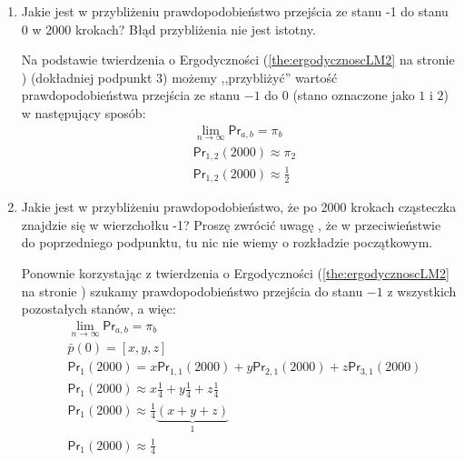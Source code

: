 \begin{enumerate}[label=\alph*)]
\item Jakie jest w przybliżeniu prawdopodobieństwo przejścia ze stanu -1 do stanu 0 w 2000 krokach? Błąd przybliżenia nie jest istotny.

Na podstawie twierdzenia o Ergodyczności (\ref{the:ergodycznoscLM2} na stronie \pageref{the:ergodycznoscLM2}) (dokładniej podpunkt 3) możemy ,,przybliżyć'' wartość prawdopodobieństwa przejścia ze stanu $-1$ do $0$ (stano oznaczone jako $1$ i $2$) w następujący sposób:
\begin{align*}
&\lim _{n\rightarrow \infty} \mathsf{Pr}_{a,b}=\pi _b\\
&\mathsf{Pr}_{1,2}(2000)\approx \pi _2\\
&\mathsf{Pr}_{1,2}(2000)\approx \frac{1}{2}
\end{align*}
\item Jakie jest w przybliżeniu prawdopodobieństwo, że po 2000 krokach cząsteczka znajdzie się w wierzchołku -1? Proszę zwrócić uwagę , że w przeciwieństwie do poprzedniego podpunktu, tu nic nie wiemy o rozkładzie początkowym.

Ponownie korzystając z twierdzenia o Ergodyczności (\ref{the:ergodycznoscLM2} na stronie \pageref{the:ergodycznoscLM2}) szukamy prawdopodobieństwo przejścia do stanu $-1$ z wszystkich pozostałych stanów, a więc:
\begin{align*}
&\lim _{n\rightarrow \infty} \mathsf{Pr}_{a,b}=\pi _b\\
&\bar{p}(0)=\left[x,y, z\right]\\
&\mathsf{Pr}_1 (2000)=x\mathsf{Pr}_{1,1}(2000)+y\mathsf{Pr}_{2,1}(2000)+z\mathsf{Pr}_{3,1}(2000)\\
&\mathsf{Pr}_1 (2000)\approx x\frac{1}{4}+y\frac{1}{4}+z\frac{1}{4}\\
&\mathsf{Pr}_1 (2000)\approx \frac{1}{4}\underbrace{(x+y+z)}_1\\
&\mathsf{Pr}_1 (2000)\approx \frac{1}{4}
\end{align*}
\end{enumerate}

